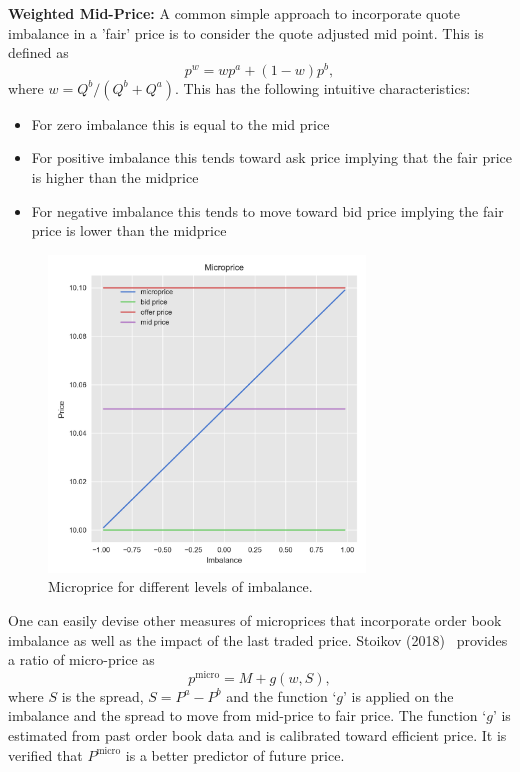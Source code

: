 \noindent\textbf{Weighted Mid-Price:} A common simple approach to incorporate quote imbalance in a 'fair' price is to consider the quote adjusted mid point. This is defined as
	\begin{equation}\label{eqn:microprice}
		p^w= w p^a + (1-w) p^b,
	\end{equation}
where $w= Q^b/(Q^b+Q^a)$. This has the following intuitive characteristics: 
	\begin{itemize}
	\item For zero imbalance this is equal to the mid price
	\item For positive imbalance this tends toward ask price implying that the fair price is higher than the midprice
	\item For negative imbalance this tends to move toward bid price implying the fair price is lower than the midprice
\end{itemize}
	\begin{figure}[!ht]
	\centering
	\includegraphics[width=0.75\textwidth]{chapters/chapter_trade_data_models/figures/microprice.png} 
	\caption{Microprice for different levels of imbalance. \label{fig:microprice}}
	\end{figure}

One can easily devise other measures of microprices that incorporate order book imbalance as well as the impact of the last traded price. Stoikov (2018)~\cite{stoikov18} provides a ratio of micro-price as
	\begin{equation} \label{eqn:pmicro}
	p^\text{micro}= M + g(w,S),
	\end{equation}
where $S$ is the spread, $S= P^a - P^b$ and the function `$g$' is applied on the imbalance and the spread to move from mid-price to fair price. The function `$g$' is estimated from past order book data and is calibrated toward efficient price. It is verified that $P^\text{micro}$ is a better predictor of future price. \\


